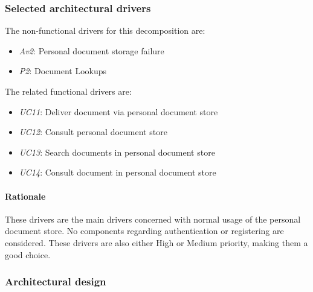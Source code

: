\documentclass[a4paper,10pt]{article}
\begin{document}
\subsubsection{Selected architectural drivers}
The non-functional drivers for this decomposition are:

\begin{itemize}
    \item \emph{Av2}: Personal document storage failure
    \item \emph{P2}: Document Lookups
\end{itemize}

The related functional drivers are:

\begin{itemize}
    \item \emph{UC11}: Deliver document via personal document store
    \item \emph{UC12}: Consult personal document store
    \item \emph{UC13}: Search documents in personal document store
    \item \emph{UC14}: Consult document in personal document store
\end{itemize}

\paragraph{Rationale}
These drivers are the main drivers concerned with normal usage of the personal document store. No components regarding authentication or registering are considered. These drivers are also either High or Medium priority, making them a good choice.

\subsubsection{Architectural design}
\end{document}

